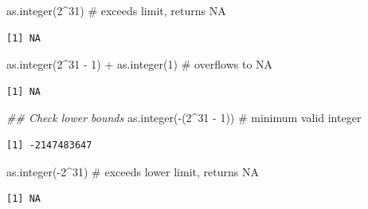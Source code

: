 \documentclass[
  letterpaper,
  DIV=11,
  numbers=noendperiod]{scrreprt}
\newenvironment{Shaded}{\begin{snugshade}}{\end{snugshade}}
\newcommand{\CommentTok}[1]{\textcolor[rgb]{0.37,0.37,0.37}{#1}}
\newcommand{\DecValTok}[1]{\textcolor[rgb]{0.68,0.00,0.00}{#1}}
\newcommand{\DocumentationTok}[1]{\textcolor[rgb]{0.37,0.37,0.37}{\textit{#1}}}
\newcommand{\FunctionTok}[1]{\textcolor[rgb]{0.28,0.35,0.67}{#1}}
\newcommand{\NormalTok}[1]{\textcolor[rgb]{0.00,0.23,0.31}{#1}}
\newcommand{\SpecialCharTok}[1]{\textcolor[rgb]{0.37,0.37,0.37}{#1}}
\begin{document}
\begin{Shaded}
\begin{Highlighting}[]
\FunctionTok{as.integer}\NormalTok{(}\DecValTok{2}\SpecialCharTok{\^{}}\DecValTok{31}\NormalTok{)                        }\CommentTok{\# exceeds limit, returns NA}
\end{Highlighting}
\end{Shaded}

\begin{verbatim}
[1] NA
\end{verbatim}

\begin{Shaded}
\begin{Highlighting}[]
\FunctionTok{as.integer}\NormalTok{(}\DecValTok{2}\SpecialCharTok{\^{}}\DecValTok{31} \SpecialCharTok{{-}} \DecValTok{1}\NormalTok{) }\SpecialCharTok{+} \FunctionTok{as.integer}\NormalTok{(}\DecValTok{1}\NormalTok{)    }\CommentTok{\# overflows to NA}
\end{Highlighting}
\end{Shaded}

\begin{verbatim}
[1] NA
\end{verbatim}

\begin{Shaded}
\begin{Highlighting}[]
\DocumentationTok{\#\# Check lower bounds}
\FunctionTok{as.integer}\NormalTok{(}\SpecialCharTok{{-}}\NormalTok{(}\DecValTok{2}\SpecialCharTok{\^{}}\DecValTok{31} \SpecialCharTok{{-}} \DecValTok{1}\NormalTok{))                 }\CommentTok{\# minimum valid integer}
\end{Highlighting}
\end{Shaded}

\begin{verbatim}
[1] -2147483647
\end{verbatim}

\begin{Shaded}
\begin{Highlighting}[]
\FunctionTok{as.integer}\NormalTok{(}\SpecialCharTok{{-}}\DecValTok{2}\SpecialCharTok{\^{}}\DecValTok{31}\NormalTok{)                       }\CommentTok{\# exceeds lower limit, returns NA}
\end{Highlighting}
\end{Shaded}

\begin{verbatim}
[1] NA
\end{verbatim}
\end{document}
